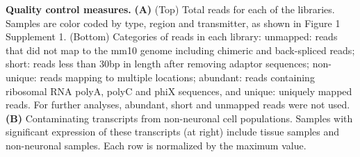 \textbf{Quality control measures.} \textbf{(A)} (Top) Total reads for each of the libraries. Samples are color coded by type, region and transmitter, as shown in Figure 1 Supplement 1. (Bottom) Categories of reads in each library: unmapped: reads that did not map to the mm10 genome including chimeric and back-spliced reads; short: reads less than 30bp in length after removing adaptor sequences; non-unique: reads mapping to multiple locations; abundant: reads containing ribosomal RNA polyA, polyC and phiX sequences, and unique: uniquely mapped reads. For further analyses, abundant, short and unmapped reads were not used.
\textbf{(B)} Contaminating transcripts from non-neuronal cell populations. Samples with significant expression of these transcripts (at right) include tissue samples and non-neuronal samples. Each row is normalized by the maximum value. 
